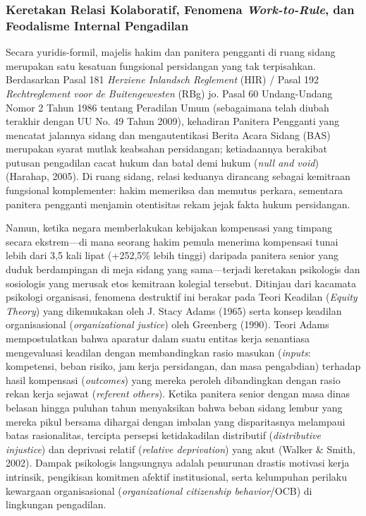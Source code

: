 \documentclass[12pt, a4paper]{article}
\begin{document}
\subsubsection{Keretakan Relasi Kolaboratif, Fenomena \textit{Work-to-Rule}, dan Feodalisme Internal Pengadilan}

Secara yuridis-formil, majelis hakim dan panitera pengganti di ruang sidang merupakan satu kesatuan fungsional persidangan yang tak terpisahkan. Berdasarkan Pasal 181 \textit{Herziene Inlandsch Reglement} (HIR) / Pasal 192 \textit{Rechtreglement voor de Buitengewesten} (RBg) jo. Pasal 60 Undang-Undang Nomor 2 Tahun 1986 tentang Peradilan Umum (sebagaimana telah diubah terakhir dengan UU No. 49 Tahun 2009), kehadiran Panitera Pengganti yang mencatat jalannya sidang dan mengautentikasi Berita Acara Sidang (BAS) merupakan syarat mutlak keabsahan persidangan; ketiadaannya berakibat putusan pengadilan cacat hukum dan batal demi hukum (\textit{null and void}) (Harahap, 2005). Di ruang sidang, relasi keduanya dirancang sebagai kemitraan fungsional komplementer: hakim memeriksa dan memutus perkara, sementara panitera pengganti menjamin otentisitas rekam jejak fakta hukum persidangan.

Namun, ketika negara memberlakukan kebijakan kompensasi yang timpang secara ekstrem---di mana seorang hakim pemula menerima kompensasi tunai lebih dari 3,5 kali lipat (+252,5\% lebih tinggi) daripada panitera senior yang duduk berdampingan di meja sidang yang sama---terjadi keretakan psikologis dan sosiologis yang merusak etos kemitraan kolegial tersebut. Ditinjau dari kacamata psikologi organisasi, fenomena destruktif ini berakar pada Teori Keadilan (\textit{Equity Theory}) yang dikemukakan oleh J. Stacy Adams (1965) serta konsep keadilan organisasional (\textit{organizational justice}) oleh Greenberg (1990). Teori Adams mempostulatkan bahwa aparatur dalam suatu entitas kerja senantiasa mengevaluasi keadilan dengan membandingkan rasio masukan (\textit{inputs}: kompetensi, beban risiko, jam kerja persidangan, dan masa pengabdian) terhadap hasil kompensasi (\textit{outcomes}) yang mereka peroleh dibandingkan dengan rasio rekan kerja sejawat (\textit{referent others}). Ketika panitera senior dengan masa dinas belasan hingga puluhan tahun menyaksikan bahwa beban sidang lembur yang mereka pikul bersama dihargai dengan imbalan yang disparitasnya melampaui batas rasionalitas, tercipta persepsi ketidakadilan distributif (\textit{distributive injustice}) dan deprivasi relatif (\textit{relative deprivation}) yang akut (Walker \& Smith, 2002). Dampak psikologis langsungnya adalah penurunan drastis motivasi kerja intrinsik, pengikisan komitmen afektif institusional, serta kelumpuhan perilaku kewargaan organisasional (\textit{organizational citizenship behavior}/OCB) di lingkungan pengadilan.
\end{document}
